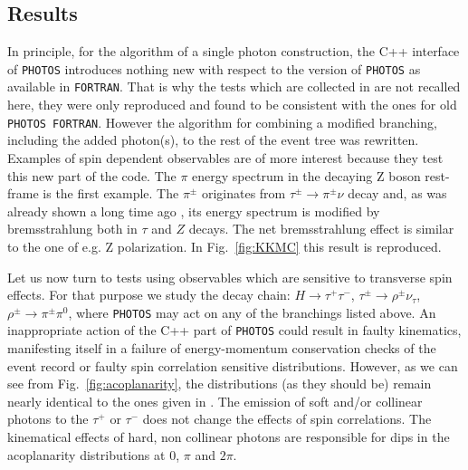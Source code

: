 \documentclass[]{Photos_interface_design}
\begin{document}
\subsection{Results}
\label{sec:results}
In principle, for the algorithm of a single photon construction, the C++ interface of
{\tt PHOTOS} introduces nothing new with respect to the 
version of {\tt PHOTOS} as available in {\tt FORTRAN}.
That is why the  tests which are collected in \cite{Photos_tests} are not
recalled here, they were only reproduced and found to be consistent with the ones for
old {\tt PHOTOS FORTRAN}.
However the algorithm for combining a modified branching, including the added 
photon(s), to the rest of the event tree was rewritten.
Examples of spin dependent observables are of more interest because they test this new part of the code.
The $\pi$ energy spectrum in the decaying
Z boson rest-frame is the first example. 
The $\pi^\pm$ originates from $\tau^\pm \to \pi^\pm \nu $ decay and, 
as was already shown a long time ago \cite{Boillot:1988re}, its energy spectrum is modified by bremsstrahlung both in $\tau$ and $Z$ decays. The net
bremsstrahlung  effect is similar to the one of e.g. Z polarization. In Fig.~\ref{fig:KKMC} this result is reproduced.

Let us now turn to tests using observables which are sensitive to
transverse spin effects.  For that purpose we study the decay chain:
$H\to \tau^+\tau^-$, $\tau^\pm \to \rho^\pm \nu_\tau$, $\rho^\pm \to
\pi^\pm \pi^0$, where {\tt PHOTOS} may act on any of the branchings
listed above. An inappropriate action of the C++ part of {\tt PHOTOS}
could result in faulty kinematics, manifesting itself in a failure of
energy-momentum conservation checks of the event record or faulty spin
correlation sensitive distributions. However, as we can see from Fig.~\ref{fig:acoplanarity},
 the distributions (as they should be) remain nearly identical to the ones given in
\cite{tauolaC++,Davidson:2010rw}. The emission of soft and/or
collinear photons to the $\tau^+$ or $\tau^-$ does not change the
effects of spin correlations. The kinematical effects of hard,
non collinear  photons are responsible for dips in 
the acoplanarity distributions at $0$, $\pi$ and $2\pi$.
\end{document}
